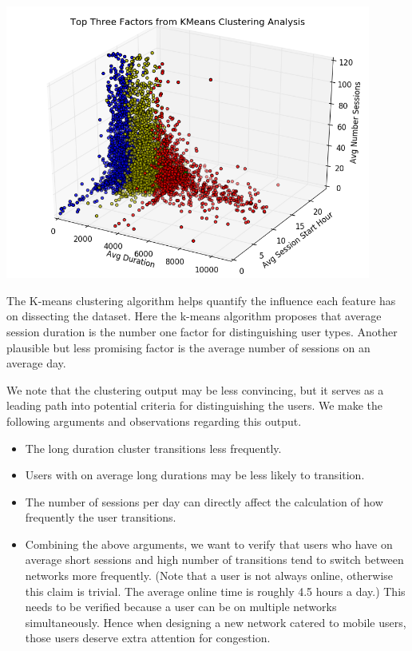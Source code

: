 \documentclass[]{article}
\newenvironment{Figure}
  {\par\medskip\noindent\minipage{\linewidth}}
  {\endminipage\par\medskip}
\begin{document}
\begin{Figure}
 \centering
 \includegraphics[height = 9cm, width =12cm]{Threefactorclustering.png}
\end{Figure}

The K-means clustering algorithm helps quantify the influence each feature has on dissecting the dataset. Here the k-means algorithm proposes that average session duration is the number one factor for distinguishing user types. Another plausible but less promising factor is the average number of sessions on an average day. 

We note that the clustering output may be less convincing, but it serves as a leading path into potential criteria for distinguishing the users. We make the following arguments and observations regarding this output.

\begin{itemize}
\item
The long duration cluster transitions less frequently.
\item
Users with on average long durations may be less likely to transition. %
\item
The number of sessions per day can directly affect the calculation of how frequently the user transitions.
\item
Combining the above arguments, we want to verify that users who have on average short sessions and high number of transitions tend to switch between networks more frequently. (Note that a user is not always online, otherwise this claim is trivial. The average online time is roughly 4.5 hours a day\cite{yang}.) This needs to be verified because a user can be on multiple networks simultaneously. Hence when designing a new network catered to mobile users, those users deserve extra attention for congestion.
\end{itemize} 
\end{document}

